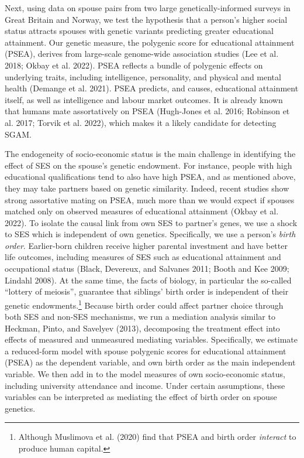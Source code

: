 \documentclass[
  12pt,
]{article}
\theoremstyle{definition}
\theoremstyle{definition}
\theoremstyle{definition}
\theoremstyle{definition}
\theoremstyle{remark}
\begin{document}
Next, using data on spouse pairs from two large genetically-informed surveys in
Great Britain and Norway, we test the hypothesis that a person's higher
social status attracts spouses with genetic variants predicting greater educational
attainment. Our genetic measure, the polygenic score for educational attainment
(PSEA), derives from large-scale genome-wide association studies (Lee et al. 2018; Okbay et al. 2022). PSEA reflects a bundle of polygenic effects on underlying
traits, including intelligence, personality, and physical and mental health
(Demange et al. 2021). PSEA predicts, and causes, educational attainment
itself, as well as intelligence and labour market outcomes. It is already known
that humans mate assortatively on PSEA (Hugh-Jones et al. 2016; Robinson et al. 2017; Torvik et al. 2022), which makes it a likely candidate
for detecting SGAM.

The endogeneity of socio-economic status is the main challenge in identifying
the effect of SES on the spouse's genetic endowment. For instance, people with
high educational qualifications tend to also have high PSEA, and as mentioned
above, they may take partners based on genetic similarity. Indeed, recent
studies show strong assortative mating on PSEA, much more than we would expect
if spouses matched only on observed measures of educational attainment
(Okbay et al. 2022). To isolate the causal link from own SES to partner's
genes, we use a shock to SES which is independent of own genetics. Specifically,
we use a person's \emph{birth order}. Earlier-born children receive higher parental
investment and have better life outcomes, including measures of SES such as
educational attainment and occupational status (Black, Devereux, and Salvanes 2011; Booth and Kee 2009; Lindahl 2008). At the same time, the facts of biology, in
particular the so-called ``lottery of meiosis'', guarantee that siblings' birth
order is independent of their genetic endowments.\footnote{Although Muslimova et al. (2020) find that PSEA and birth order
  \emph{interact} to produce human capital.} Because birth order
could affect partner choice through both SES and non-SES mechanisms, we run a
mediation analysis similar to Heckman, Pinto, and Savelyev (2013), decomposing the treatment
effect into effects of measured and unmeasured mediating variables. Specifically,
we estimate a reduced-form model with spouse polygenic scores for educational
attainment (PSEA) as the dependent variable, and own birth order as the main
independent variable. We then add in to the model measures of own socio-economic
status, including university attendance and income. Under certain assumptions,
these variables can be interpreted as mediating the effect of birth order on
spouse genetics.
\end{document}
